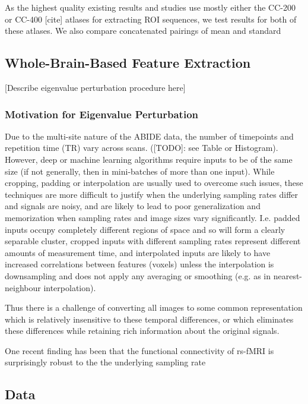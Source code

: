 \documentclass[10pt]{article}
\begin{document}
As the highest quality existing results and studies use mostly either the CC-200 or CC-400 [cite] atlases for extracting
ROI sequences, we test results for both of these atlases. We also compare concatenated pairings of mean and standard

\subsection{Whole-Brain-Based Feature Extraction}

[Describe eigenvalue perturbation procedure here]

\subsubsection{Motivation for Eigenvalue Perturbation}

Due to the multi-site nature of the ABIDE data, the number of timepoints and repetition time (TR)
vary across scans. ([TODO]: see Table or Histogram). However, deep or machine learning algorithms
require inputs to be of the same size (if not generally, then in mini-batches of more than one
input). While cropping, padding or interpolation are usually used to overcome such issues, these
techniques are more difficult to justify when the underlying sampling rates differ and signals are
noisy, and are likely to lead to poor generalization and memorization when sampling rates and image
sizes vary significantly. I.e. padded inputs occupy completely different regions of space and so
will form a clearly separable cluster, cropped inputs with different sampling rates represent
different amounts of measurement time, and interpolated inputs are likely to have increased
correlations between features (voxels) unless the interpolation is downsampling and does not apply
any averaging or smoothing (e.g. as in nearest-neighbour interpolation).

Thus there is a challenge of converting all images to some common representation which is relatively
insensitive to these temporal differences, or which eliminates these differences while retaining
rich information about the original signals.

One recent finding has been that the functional connectivity of rs-fMRI is surprisingly robust to the
the underlying sampling rate \citep{huotariSamplingRateEffects2019,shakilEvaluationSlidingWindow2016}

\subsection{Data}
\end{document}
